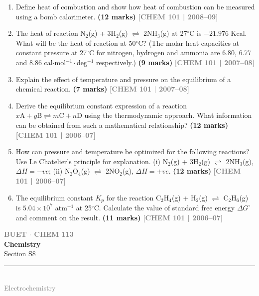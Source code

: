 \documentclass[12pt,a3paper]{article}
\newcommand{\yr}[1]{\hfill\textcolor{gray}{\small\textbf{[#1]}}}
\newcommand{\mk}[1]{\textcolor{orange!70!black}{\small\textbf{(#1 marks)}}}
\newcommand{\secdivider}[4]{%
  \newpage\thispagestyle{empty}%
  \vspace*{\fill}%
  \begin{tcolorbox}[enhanced,colback=#4!7,colframe=#3,boxrule=1.5pt,arc=8pt,
    left=20pt,right=20pt,top=22pt,bottom=22pt,
    shadow={3pt}{-3pt}{0pt}{black!15}]
    \centering
    {\large\textcolor{gray}{\textbf{BUET $\cdot$ CHEM 113}}}\\[8pt]
    {\fontsize{26}{32}\selectfont\bfseries\textcolor{#3}{Chemistry}}\\[6pt]
    {\fontsize{15}{19}\selectfont\textcolor{dgray}{#1}}\\[12pt]
    \textcolor{#3!60}{\rule{0.5\textwidth}{0.5pt}}\\[6pt]
    {\small\textcolor{gray}{#2}}
  \end{tcolorbox}%
  \vspace*{\fill}\newpage%
}
\begin{document}
\begin{enumerate}
\item Define heat of combustion and show how heat of combustion can be measured using a bomb calorimeter. \mk{12}
\yr{CHEM 101 | 2008--09}



\item The heat of reaction N$_2$(g) + 3H$_2$(g) $\rightleftharpoons$ 2NH$_3$(g) at 27$^\circ$C is $-21.976$ Kcal. What will be the heat of reaction at 50$^\circ$C? (The molar heat capacities at constant pressure at 27$^\circ$C for nitrogen, hydrogen and ammonia are 6.80, 6.77 and 8.86 cal$\cdot$mol$^{-1}\cdot$deg$^{-1}$ respectively.) \mk{9}
\yr{CHEM 101 | 2007--08}



\item Explain the effect of temperature and pressure on the equilibrium of a chemical reaction. \mk{7}
\yr{CHEM 101 | 2007--08}





\item Derive the equilibrium constant expression of a reaction $x\text{A} + y\text{B} \rightleftharpoons m\text{C} + n\text{D}$ using the thermodynamic approach. What information can be obtained from such a mathematical relationship? \mk{12}
\yr{CHEM 101 | 2006--07}



\item How can pressure and temperature be optimized for the following reactions? Use Le Chatelier's principle for explanation. (i) N$_2$(g) + 3H$_2$(g) $\rightleftharpoons$ 2NH$_3$(g), $\Delta H = -ve$; (ii) N$_2$O$_4$(g) $\rightleftharpoons$ 2NO$_2$(g), $\Delta H = +ve$. \mk{12}
\yr{CHEM 101 | 2006--07}



\item The equilibrium constant $K_p$ for the reaction C$_2$H$_4$(g) + H$_2$(g) $\rightleftharpoons$ C$_2$H$_6$(g) is $5.04 \times 10^7$ atm$^{-1}$ at 25$^\circ$C. Calculate the value of standard free energy $\Delta G^\circ$ and comment on the result. \mk{11}
\yr{CHEM 101 | 2006--07}



\end{enumerate}
\newpage

\secdivider{Section S8}{Electrochemistry}{cA}{cA}
\end{document}

